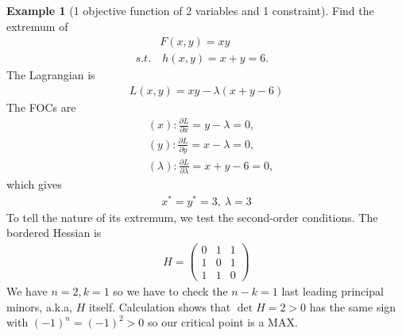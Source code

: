 \documentclass[11pt,a4paper]{book}
\theoremstyle{definition}\newtheorem{definition}{Definition}
\theoremstyle{definition}\newtheorem{fact}{Fact}
\theoremstyle{definition}\newtheorem{remark}{Remark}
\theoremstyle{definition}\newtheorem{ex}{Ex.}
\theoremstyle{definition}\newtheorem{project}{Project}
\theoremstyle{definition}\newtheorem{problem}{Problem}
\theoremstyle{definition}\newtheorem{example}{Example}
\numberwithin{theorem}{section}
\numberwithin{corollary}{chapter}
\numberwithin{assumption}{chapter}
\numberwithin{definition}{chapter}
\numberwithin{prop}{chapter}
\numberwithin{notation}{chapter}
\numberwithin{problem}{chapter}
\numberwithin{example}{chapter}
\numberwithin{fact}{chapter}
\numberwithin{ex}{chapter}
\begin{document}
		\begin{example}[1 objective function of 2 variables and 1 constraint]
		
		Find the extremum of
		\begin{align*}
			& F(x,y) = xy          \\
			s.t. &\ h(x,y) = x+ y = 6. &                      
		\end{align*}
		The Lagrangian is
		\begin{align*}
			L(x,y) = xy - \lambda (x+y-6) 
		\end{align*}
		The FOCs are
		\begin{align*}
			& (x): \frac{\partial L}{\partial x} = y - \lambda = 0,           \\
			& (y): \frac{\partial L}{\partial y} = x - \lambda = 0,           \\
			& (\lambda): \frac{\partial L}{\partial \lambda} = x + y - 6 = 0, 
		\end{align*}
		which gives
		\begin{align*}
			x^* = y^* = 3, \ \lambda = 3 
		\end{align*}
		To tell the nature of its extremum, we test the second-order conditions. The bordered Hessian is
		\begin{align*}
			H = \begin{pmatrix}
				0 & 1 & 1 \\
				1 & 0 & 1 \\
				1 & 1 & 0 
			\end{pmatrix}
		\end{align*}
		We have $n=2, k=1$ so we have to check the $n-k=1$ last leading principal minors, a.k.a, $H$ itself. Calculation shows that $\det H = 2 > 0$ has the same sign with $(-1)^n = (-1)^2 > 0$ so our critical point is a MAX. 
	\end{example}
	
\end{document}

